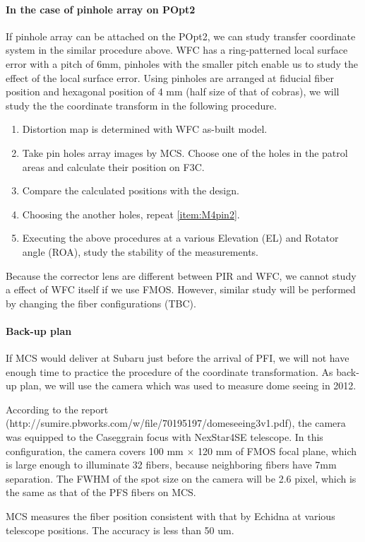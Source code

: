 \paragraph{In the case of pinhole array on POpt2}
If pinhole array can be attached on the POpt2, we can study transfer coordinate system in the similar procedure above.
WFC has a ring-patterned local surface error with a pitch of 6mm, pinholes with the smaller pitch enable us to study the effect of the local surface error.
Using pinholes are arranged at fiducial fiber position and hexagonal position of 4 mm (half size of that of cobras), we will study the the coordinate transform in the following procedure.
\begin{enumerate}
\item Distortion map is determined with WFC as-built model.
\item \label{item:M4pin2} Take pin holes array images by MCS.
Choose one of the holes in the patrol areas and calculate their position on F3C.
\item Compare the calculated positions with the design.
\item Choosing the another holes, repeat \ref{item:M4pin2}.
\item Executing the above procedures at a various Elevation (EL) and Rotator angle (ROA), study the stability of the measurements.
\end{enumerate}

Because the corrector lens are different between PIR and WFC, we cannot study a effect of WFC itself if we use FMOS.
However, similar study will be performed by changing the fiber configurations (TBC).


\paragraph{Back-up plan}
If MCS would deliver at Subaru just before the arrival of PFI, we will not have enough time to practice the procedure of the coordinate transformation.
As back-up plan, we will use the camera which was used to measure dome seeing in 2012.

According to the report (http://sumire.pbworks.com/w/file/70195197/domeseeing3v1.pdf), the camera was equipped to the Caseggrain focus with NexStar4SE telescope.
In this configuration, the camera covers 100 mm $\times$ 120 mm of FMOS focal plane, which is large enough to illuminate 32 fibers, because neighboring fibers have 7mm separation.
The FWHM of the spot size on the camera will be 2.6 pixel, which is the same as that of the PFS fibers on MCS.

\begin{itembox}[l]{}
MCS measures the fiber position consistent with that by Echidna at various telescope positions. 
The accuracy is less than 50 um.

\end{itembox}